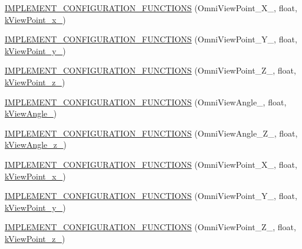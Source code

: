 \begin{DoxyCompactItemize}
\item 
\hyperlink{a00190_ae59a7ecd1bf2c52d70c13b18ce654b0b}{I\-M\-P\-L\-E\-M\-E\-N\-T\-\_\-\-C\-O\-N\-F\-I\-G\-U\-R\-A\-T\-I\-O\-N\-\_\-\-F\-U\-N\-C\-T\-I\-O\-N\-S} (Omni\-View\-Point\-\_\-\-X\-\_, float, \hyperlink{a00186_a74c9e662a755f04c035d8d4c5184cb6d}{k\-View\-Point\-\_\-x\-\_})
\item 
\hyperlink{a00190_a8484d4ef4d609c87ac342fa92e3e959e}{I\-M\-P\-L\-E\-M\-E\-N\-T\-\_\-\-C\-O\-N\-F\-I\-G\-U\-R\-A\-T\-I\-O\-N\-\_\-\-F\-U\-N\-C\-T\-I\-O\-N\-S} (Omni\-View\-Point\-\_\-\-Y\-\_, float, \hyperlink{a00186_a16973d586ea7b2c98b1772046fd61431}{k\-View\-Point\-\_\-y\-\_})
\item 
\hyperlink{a00190_ac85a8bd8e12282cb340d22b5ccdcadea}{I\-M\-P\-L\-E\-M\-E\-N\-T\-\_\-\-C\-O\-N\-F\-I\-G\-U\-R\-A\-T\-I\-O\-N\-\_\-\-F\-U\-N\-C\-T\-I\-O\-N\-S} (Omni\-View\-Point\-\_\-\-Z\-\_, float, \hyperlink{a00186_af84ee1e2c76e3f5eb8a51e914c587861}{k\-View\-Point\-\_\-z\-\_})
\item 
\hyperlink{a00190_a781b0c440725d66c0bbeccba76493e04}{I\-M\-P\-L\-E\-M\-E\-N\-T\-\_\-\-C\-O\-N\-F\-I\-G\-U\-R\-A\-T\-I\-O\-N\-\_\-\-F\-U\-N\-C\-T\-I\-O\-N\-S} (Omni\-View\-Angle\-\_, float, \hyperlink{a00186_ad8032f50b7cf909de4b3e2734f38047b}{k\-View\-Angle\-\_})
\item 
\hyperlink{a00190_a8be89512d6d80f93c57ceed0bc876bd3}{I\-M\-P\-L\-E\-M\-E\-N\-T\-\_\-\-C\-O\-N\-F\-I\-G\-U\-R\-A\-T\-I\-O\-N\-\_\-\-F\-U\-N\-C\-T\-I\-O\-N\-S} (Omni\-View\-Angle\-\_\-\-Z\-\_, float, \hyperlink{a00186_ababb374a6f171c239aadfada37830424}{k\-View\-Angle\-\_\-z\-\_})
\item 
\hyperlink{a00190_a5b60cca38ae06a2e29df5b82addb23fb}{I\-M\-P\-L\-E\-M\-E\-N\-T\-\_\-\-C\-O\-N\-F\-I\-G\-U\-R\-A\-T\-I\-O\-N\-\_\-\-F\-U\-N\-C\-T\-I\-O\-N\-S} (Omni\-View\-Point\-\_\-\-X\-\_, float, \hyperlink{a00186_af23c99a8f775b785c66d147f0a6ea579}{k\-View\-Point\-\_\-x\-\_})
\item 
\hyperlink{a00190_a7a6ebc57c936b8f1bc7d150f88bc829f}{I\-M\-P\-L\-E\-M\-E\-N\-T\-\_\-\-C\-O\-N\-F\-I\-G\-U\-R\-A\-T\-I\-O\-N\-\_\-\-F\-U\-N\-C\-T\-I\-O\-N\-S} (Omni\-View\-Point\-\_\-\-Y\-\_, float, \hyperlink{a00186_a80868fccf9e801168c40bcf130f32794}{k\-View\-Point\-\_\-y\-\_})
\item 
\hyperlink{a00190_a4953566037f3b7d5cc10d67170dbb6de}{I\-M\-P\-L\-E\-M\-E\-N\-T\-\_\-\-C\-O\-N\-F\-I\-G\-U\-R\-A\-T\-I\-O\-N\-\_\-\-F\-U\-N\-C\-T\-I\-O\-N\-S} (Omni\-View\-Point\-\_\-\-Z\-\_, float, \hyperlink{a00186_ad03f149c2afc08a711c5ab6a5e4b9567}{k\-View\-Point\-\_\-z\-\_})

\end{DoxyCompactItemize}
